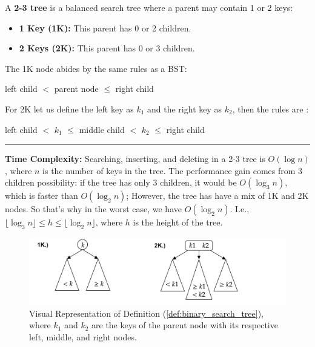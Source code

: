 \begin{Def}

    A \textbf{2-3 tree} is a balanced search tree where a parent may contain 1 or 2 keys:
    \begin{itemize}
        \item \textbf{1 Key (1K):} This parent has 0 or 2 children.
        \item \textbf{2 Keys (2K):} This parent has 0 or 3 children.
    \end{itemize}
    \noindent
    The 1K node abides by the same rules as a BST:
    \begin{center}
        left child $<$ parent node $\leq$ right child
    \end{center}
    \noindent
    For 2K let us define the left key as $k_1$ and the right key as $k_2$, then the rules are :
    \begin{center}
        left child $<$ $k_1$ $\leq$ middle child $<$ $k_2$ $\leq$ right child
    \end{center}
    \noindent
    \rule{\textwidth}{0.4pt}
    \textbf{Time Complexity:} Searching, inserting, and deleting in a 2-3 tree is $O(\log n)$, where $n$ is the number of keys in the tree.
    The performance gain comes from 3 children possibility: if the tree has only 3 children, it would be 
    $O(\log_3 n)$, which is faster than $O(\log_2 n)$; However, the tree has have a mix of 1K and 2K nodes.
    So that's why in the worst case, we have $O(\log_2 n)$. I.e., $\lfloor{\log_3 n}\rfloor \leq h \leq \lfloor{\log_2 n}\rfloor$, where $h$ is the height of the tree.
\end{Def}

\begin{figure}[h]
    \begin{center}
    \includegraphics[width=\textwidth]{./Sections/graphs/search/2_3.png}
    \end{center}
     \caption{Visual Representation of Definition (\ref{def:binary_search_tree}), where $k_1$ and $k_2$ are the keys of the parent node with its respective left, middle, and right nodes.}\label{fig:2-3_tree}
  \end{figure}
\newpage

